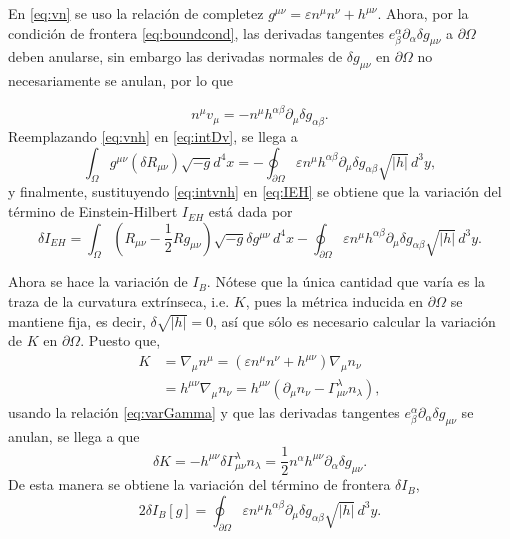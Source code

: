 %
En \eqref{eq:vn} se uso la relaci\'{o}n de completez $g^{\mu \nu} = \varepsilon n^{\mu} n^{\nu} + h^{\mu \nu}$. Ahora, por la condici\'{o}n de frontera \eqref{eq:boundcond}, las derivadas tangentes $e^{\alpha}_{\beta} \partial_{\alpha} \delta g_{\mu \nu}$ a $\partial \Omega$ deben anularse, sin embargo las derivadas normales de $\delta g_{\mu \nu}$ en $\partial \Omega$ no necesariamente se anulan, por lo que

\begin{equation}
\label{eq:vnh}
n^{\mu} v_{\mu} = - n^{\mu} h^{\alpha \beta} \partial_{\mu} \delta g_{\alpha \beta}.
\end{equation}
%
Reemplazando \eqref{eq:vnh} en \eqref{eq:intDv}, se llega a
%
\begin{equation}
\label{eq:intvnh}
\int_{\Omega} g^{\mu \nu} (\delta R_{\mu \nu}) \sqrt{-g} d^4 x = - \oint_{\partial \Omega} \varepsilon n^{\mu} h^{\alpha \beta} \partial_{\mu} \delta g_{\alpha \beta} \sqrt{|h|} \, d^{3} y,
\end{equation}
%
y finalmente, sustituyendo \eqref{eq:intvnh} en \eqref{eq:IEH} se obtiene que la variaci\'{o}n del t\'{e}rmino de Einstein-Hilbert $I_{EH}$ est\'{a} dada por
%
\begin{equation}
\label{eq:varIEH}
\delta I_{EH} = \int_{\Omega} \left(R_{\mu \nu} - \frac{1}{2} R g_{\mu \nu} \right) \sqrt{-g} \delta g^{\mu \nu} \, d^{4} x - \oint_{\partial \Omega} \varepsilon n^{\mu} h^{\alpha \beta} \partial_{\mu} \delta g_{\alpha \beta} \sqrt{|h|} \, d^{3} y.
\end{equation}

Ahora se hace la variaci\'{o}n de $I_{B}$. N\'{o}tese que la \'{u}nica cantidad que var\'{i}a es la traza de la curvatura extr\'{i}nseca, i.e. $K$, pues la m\'{e}trica inducida en $\partial \Omega$ se mantiene fija, es decir, $\delta \sqrt{|h|} = 0$, as\'{i} que s\'{o}lo es necesario calcular la variaci\'{o}n de $K$ en $\partial \Omega$. Puesto que,
%
\begin{align}
\label{eq:definitionK}
K & = \nabla_{\mu} n^{\mu} = (\varepsilon n^{\mu} n^{\nu} + h^{\mu \nu}) \nabla_{\mu} n_{\nu} \nonumber \\
& = h^{\mu \nu} \nabla_{\mu} n_{\nu} = h^{\mu \nu} (\partial_{\mu} n_{\nu} - \Gamma^{\lambda}_{\mu \nu} n_{\lambda}),
\end{align}
%
usando la relaci\'{o}n \eqref{eq:varGamma} y que las derivadas tangentes $e^{\alpha}_{\beta} \partial_{\alpha} \delta g_{\mu \nu}$ se anulan, se llega a que
%
\begin{equation}
\label{eq:varK}
\delta K = -h^{\mu \nu} \delta \Gamma^{\lambda}_{\mu \nu} n_{\lambda} = \frac{1}{2} n^{\alpha} h^{\mu \nu} \partial_{\alpha} \delta g_{\mu \nu}.
\end{equation}
%
De esta manera se obtiene la variaci\'{o}n del t\'{e}rmino de frontera $\delta I_{B}$,
%
\begin{equation}
\label{eq:varIB}
2 \delta I_{B} [g] = \oint_{\partial \Omega} \varepsilon n^{\mu} h^{\alpha \beta} \partial_{\mu} \delta g_{\alpha \beta} \sqrt{|h|} \, d^{3} y.
\end{equation}

